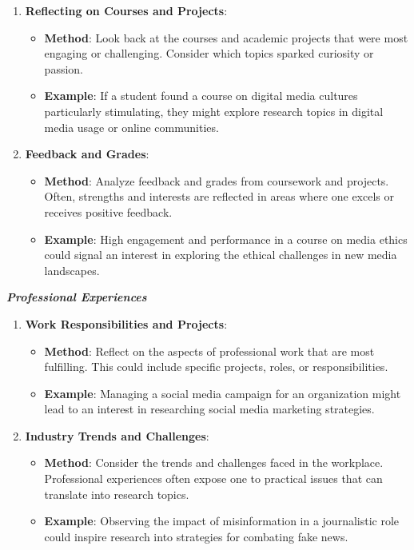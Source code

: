 \documentclass[
]{book}
\providecommand{\tightlist}{%
  \setlength{\itemsep}{0pt}\setlength{\parskip}{0pt}}
\begin{document}
\begin{enumerate}
\def\labelenumi{\arabic{enumi}.}
\tightlist
\item
  \textbf{Reflecting on Courses and Projects}:

  \begin{itemize}
  \tightlist
  \item
    \textbf{Method}: Look back at the courses and academic projects that were most engaging or challenging. Consider which topics sparked curiosity or passion.
  \item
    \textbf{Example}: If a student found a course on digital media cultures particularly stimulating, they might explore research topics in digital media usage or online communities.
  \end{itemize}
\item
  \textbf{Feedback and Grades}:

  \begin{itemize}
  \tightlist
  \item
    \textbf{Method}: Analyze feedback and grades from coursework and projects. Often, strengths and interests are reflected in areas where one excels or receives positive feedback.
  \item
    \textbf{Example}: High engagement and performance in a course on media ethics could signal an interest in exploring the ethical challenges in new media landscapes.
  \end{itemize}
\end{enumerate}

\textbf{\emph{Professional Experiences}}

\begin{enumerate}
\def\labelenumi{\arabic{enumi}.}
\tightlist
\item
  \textbf{Work Responsibilities and Projects}:

  \begin{itemize}
  \tightlist
  \item
    \textbf{Method}: Reflect on the aspects of professional work that are most fulfilling. This could include specific projects, roles, or responsibilities.
  \item
    \textbf{Example}: Managing a social media campaign for an organization might lead to an interest in researching social media marketing strategies.
  \end{itemize}
\item
  \textbf{Industry Trends and Challenges}:

  \begin{itemize}
  \tightlist
  \item
    \textbf{Method}: Consider the trends and challenges faced in the workplace. Professional experiences often expose one to practical issues that can translate into research topics.
  \item
    \textbf{Example}: Observing the impact of misinformation in a journalistic role could inspire research into strategies for combating fake news.
  \end{itemize}
\end{enumerate}
\end{document}
